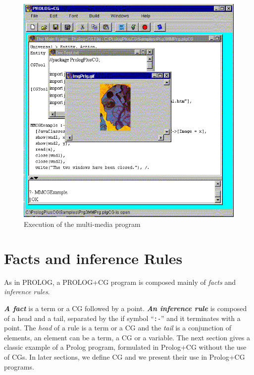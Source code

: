 \documentclass{book}
\begin{document}
\begin{htmlonly}

\begin{figure}
\begin{center}
\includegraphics{MMPrgExec.png}
\end{center}
\caption{\label{MMPrgExec}Execution of the multi-media program}
\end{figure}

\end{htmlonly}



\section{Facts and inference Rules}\label{Sec:FactsAndRules}

As in PROLOG, a PROLOG+CG program is composed mainly of
{\it facts} and {\it inference rules}.

{\it {\bf A fact}} is a term or a CG followed by a
point. {\bf {\it An inference rule}} is composed of a
head and a tail, separated by the if symbol ``\texttt{:-}'' and it terminates
with a point. The {\it head} of a rule is a term or a CG and the
{\it tail} is a conjunction of elements, an element can be a term,
a CG or a variable. The next section gives a classic example of a
Prolog program, formulated in Prolog+CG without the use of CGs. In
later sections, we define CG and we present their use in Prolog+CG
programs.
\end{document}
